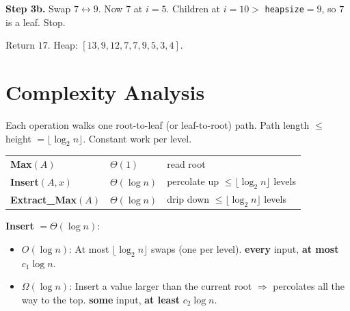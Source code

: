 \documentclass[11pt]{article}
\newcommand{\every}{\textcolor{greenO}{\textbf{every}}}
\newcommand{\atmost}{\textcolor{greenO}{\textbf{at most}}}
\newcommand{\some}{\textcolor{rustW}{\textbf{some}}}
\newcommand{\atleast}{\textcolor{rustW}{\textbf{at least}}}
\newcommand{\heapcoords}{\foreach \hi/\hx/\hy in {1/0/4.5,2/-2.3/3.0,3/2.3/3.0,4/-3.45/1.6,5/-1.15/1.6,6/1.15/1.6,7/3.45/1.6,8/-4.0/0.2,9/-2.9/0.2,10/-1.75/0.2}{\coordinate (p\hi) at (\hx,\hy);}}
\newcommand{\drawheap}[2]{%
  \heapcoords
  \begin{scope}[on background layer]\foreach \a/\b in {#2}{\draw[hedge] (p\a)--(p\b);}\end{scope}
  \foreach \idx/\val/\col in {#1}{%
     \node[hnode,text=\col] (n\idx) at (p\idx) {\val};
     \node[hidx] at ([shift={(-0.30,0.30)}]p\idx) {\idx};}
}
\begin{document}
\textbf{Step 3b.} Swap $7 \leftrightarrow 9$. Now $7$ at $i=5$. Children at $i=10 >$ \texttt{heapsize}$=9$, so $7$ is a leaf. Stop.

\begin{center}
\end{center}

Return $17$. Heap: $[13,9,12,7,7,9,5,3,4]$.

\section{Complexity Analysis}

Each operation walks one root-to-leaf (or leaf-to-root) path. Path length $\le$ height $= \lfloor \log_2 n \rfloor$. Constant work per level.

\begin{keybox}
\renewcommand{\arraystretch}{1.4}
\begin{tabular}{l l l}
\textbf{Max}$(A)$ & \textcolor{greenO}{$\Theta(1)$} & read root\\
\textbf{Insert}$(A,x)$ & \textcolor{violetT}{$\Theta(\log n)$} & percolate up $\le \lfloor\log_2 n\rfloor$ levels\\
\textbf{Extract\_Max}$(A)$ & \textcolor{violetT}{$\Theta(\log n)$} & drip down $\le \lfloor\log_2 n\rfloor$ levels\\
\end{tabular}
\end{keybox}

\textbf{Insert} $= \Theta(\log n)$:
\begin{itemize}[leftmargin=1.4em,itemsep=2pt]
  \item \textcolor{greenO}{$O(\log n)$:} At most $\lfloor\log_2 n\rfloor$ swaps (one per level). \every{} input, \atmost{} $c_1 \log n$.
  \item \textcolor{rustW}{$\Omega(\log n)$:} Insert a value larger than the current root $\Rightarrow$ percolates all the way to the top. \some{} input, \atleast{} $c_2 \log n$.
\end{itemize}
\end{document}
